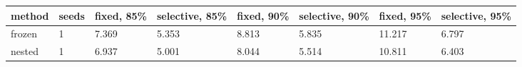 \begin{tabular}{llllllll}
\hline
method & seeds & fixed, 85\% & selective, 85\% & fixed, 90\% & selective, 90\% & fixed, 95\% & selective, 95\% \\
\hline
frozen & 1 & 7.369 & 5.353 & 8.813 & 5.835 & 11.217 & 6.797 \\
nested & 1 & 6.937 & 5.001 & 8.044 & 5.514 & 10.811 & 6.403 \\
\hline
\end{tabular}
